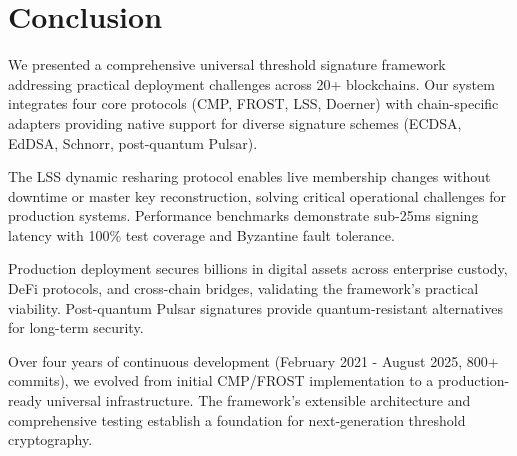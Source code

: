 \section{Conclusion}


We presented a comprehensive universal threshold signature framework addressing practical deployment challenges across 20+ blockchains. Our system integrates four core protocols (CMP, FROST, LSS, Doerner) with chain-specific adapters providing native support for diverse signature schemes (ECDSA, EdDSA, Schnorr, post-quantum Pulsar).

The LSS dynamic resharing protocol enables live membership changes without downtime or master key reconstruction, solving critical operational challenges for production systems. Performance benchmarks demonstrate sub-25ms signing latency with 100\% test coverage and Byzantine fault tolerance.

Production deployment secures billions in digital assets across enterprise custody, DeFi protocols, and cross-chain bridges, validating the framework's practical viability. Post-quantum Pulsar signatures provide quantum-resistant alternatives for long-term security.

Over four years of continuous development (February 2021 - August 2025, 800+ commits), we evolved from initial CMP/FROST implementation to a production-ready universal infrastructure. The framework's extensible architecture and comprehensive testing establish a foundation for next-generation threshold cryptography.


